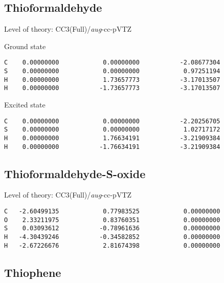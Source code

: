 \documentclass[journal=jctcce,manuscript=article,layout=traditional]{achemso}
\newcommand{\AVTZ}{\emph{aug}-cc-pVTZ}
\begin{document}
\subsection*{Thioformaldehyde}

\begin{singlespace}
Level of theory: CC3(Full)/{\AVTZ}
\end{singlespace}

\begin{singlespace}
\noindent Ground state
\begin{verbatim}
C    0.00000000            0.00000000           -2.08677304
S    0.00000000            0.00000000            0.97251194
H    0.00000000            1.73657773           -3.17013507
H    0.00000000           -1.73657773           -3.17013507
\end{verbatim}
\end{singlespace}

\begin{singlespace}
\noindent Excited state
\begin{verbatim}
C    0.00000000            0.00000000           -2.20256705
S    0.00000000            0.00000000            1.02717172
H    0.00000000            1.76634191           -3.21909384
H    0.00000000           -1.76634191           -3.21909384
\end{verbatim}
\end{singlespace}

\subsection*{Thioformaldehyde-S-oxide}

\begin{singlespace}
Level of theory: CC3(Full)/{\AVTZ}
\begin{verbatim}
C   -2.60499135            0.77983525            0.00000000
O    2.33211975            0.83760351            0.00000000
S    0.03093612           -0.78961636            0.00000000
H   -4.30439246           -0.34582852            0.00000000
H   -2.67226676            2.81674398            0.00000000
\end{verbatim}
\end{singlespace}

\subsection*{Thiophene}
\end{document}
